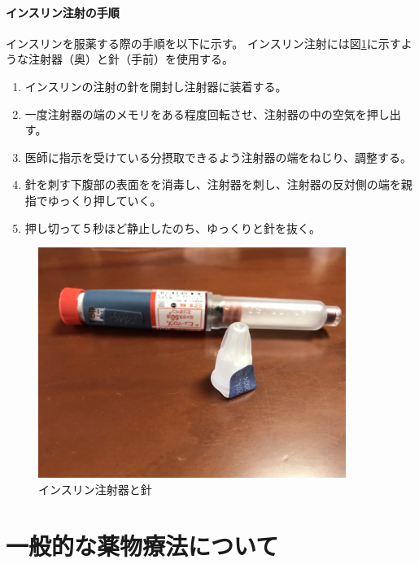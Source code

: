 \paragraph{インスリン注射の手順}
\label{paragraph:insulin_injection_steps}

インスリンを服薬する際の手順を以下に示す。
インスリン注射には図\ref{fig:insulin_pen_needle}に示すような注射器（奥）と針（手前）を使用する。

\begin{enumerate}
  \item インスリンの注射の針を開封し注射器に装着する。
  \item 一度注射器の端のメモリをある程度回転させ、注射器の中の空気を押し出す。
  \item 医師に指示を受けている分摂取できるよう注射器の端をねじり、調整する。
  \item 針を刺す下腹部の表面をを消毒し、注射器を刺し、注射器の反対側の端を親指でゆっくり押していく。
  \item 押し切って５秒ほど静止したのち、ゆっくりと針を抜く。
\end{enumerate}

\begin{figure}[htbp]
  \caption{インスリン注射器と針}
  \label{fig:insulin_pen_needle}
  \begin{center}
    \includegraphics[bb=0 0 1300 1200,width=10cm]{assets/insulin_pen_needle.jpg}
  \end{center}
\end{figure}

\newpage

\section{一般的な薬物療法について}
\label{subsection:drug_treatment}

